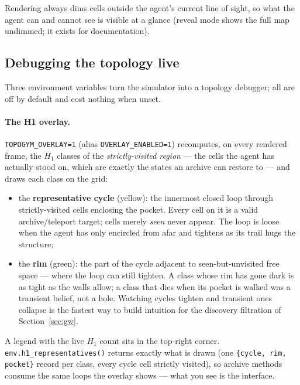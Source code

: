 \documentclass[11pt]{article}
\newcommand{\Hm}[1]{H_{#1}}
\begin{document}
Rendering always dims cells outside the agent's current line of
sight, so what the agent can and cannot see is visible at a glance
(reveal mode shows the full map undimmed; it exists for
documentation).

\subsection{Debugging the topology live}
\label{sec:overlay}

Three environment variables turn the simulator into a topology
debugger; all are off by default and cost nothing when unset.

\paragraph{The H1 overlay.} \texttt{TOPOGYM\_OVERLAY=1} (alias
\texttt{OVERLAY\_ENABLED=1}) recomputes, on every rendered frame, the
$\Hm{1}$ classes of the \emph{strictly-visited region} --- the cells
the agent has actually stood on, which are exactly the states an
archive can restore to --- and draws each class on the grid:

\begin{itemize}[leftmargin=2em, itemsep=1pt]
  \item the \textbf{representative cycle} (yellow): the innermost
        closed loop through strictly-visited cells enclosing the
        pocket. Every cell on it is a valid archive/teleport target;
        cells merely \emph{seen} never appear. The loop is loose when
        the agent has only encircled from afar and tightens as its
        trail hugs the structure;
  \item the \textbf{rim} (green): the part of the cycle adjacent to
        seen-but-unvisited free space --- where the loop can still
        tighten. A class whose rim has gone dark is as tight as the
        walls allow; a class that dies when its pocket is walked was
        a transient belief, not a hole. Watching cycles tighten and
        transient ones collapse is the fastest way to build intuition
        for the discovery filtration of Section~\ref{sec:gw}.
\end{itemize}

A legend with the live $\Hm{1}$ count sits in the top-right corner.
\texttt{env.h1\_representatives()} returns exactly what is drawn
(one \texttt{\{cycle, rim, pocket\}} record per class, every cycle
cell strictly visited), so archive methods consume the same loops the
overlay shows --- what you see is the interface.
\end{document}
